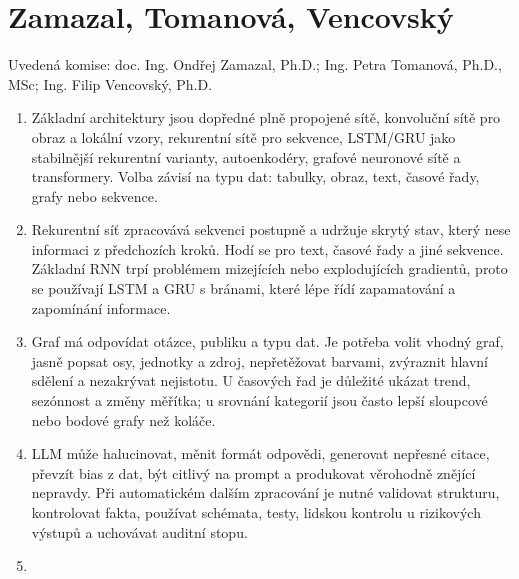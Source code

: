\documentclass[12pt,a4paper]{article}
\begin{document}
\section{Zamazal, Tomanová, Vencovský}
Uvedená komise: doc. Ing. Ondřej Zamazal, Ph.D.; Ing. Petra Tomanová, Ph.D., MSc; Ing. Filip Vencovský, Ph.D.

\begin{enumerate}
  \item {}

  Základní architektury jsou dopředné plně propojené sítě, konvoluční sítě pro obraz a lokální vzory,
  rekurentní sítě pro sekvence, LSTM/GRU jako stabilnější rekurentní varianty, autoenkodéry, grafové
  neuronové sítě a transformery. Volba závisí na typu dat: tabulky, obraz, text, časové řady, grafy
  nebo sekvence.

  \item {}

  Rekurentní síť zpracovává sekvenci postupně a udržuje skrytý stav, který nese informaci z předchozích
  kroků. Hodí se pro text, časové řady a jiné sekvence. Základní RNN trpí problémem mizejících nebo
  explodujících gradientů, proto se používají LSTM a GRU s bránami, které lépe řídí zapamatování a
  zapomínání informace.

  \item {}

  Graf má odpovídat otázce, publiku a typu dat. Je potřeba volit vhodný graf, jasně popsat osy,
  jednotky a zdroj, nepřetěžovat barvami, zvýraznit hlavní sdělení a nezakrývat nejistotu. U časových
  řad je důležité ukázat trend, sezónnost a změny měřítka; u srovnání kategorií jsou často lepší
  sloupcové nebo bodové grafy než koláče.

  \item {}

  LLM může halucinovat, měnit formát odpovědi, generovat nepřesné citace, převzít bias z dat, být
  citlivý na prompt a produkovat věrohodně znějící nepravdy. Při automatickém dalším zpracování je
  nutné validovat strukturu, kontrolovat fakta, používat schémata, testy, lidskou kontrolu u rizikových
  výstupů a uchovávat auditní stopu.

  \item {}


\end{enumerate}
\end{document}
